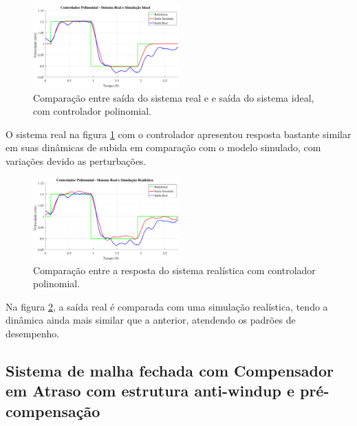 \documentclass[conference,harvard,brazil,english]{sbatex}
\begin{document}
            \begin{figure}[H]
                \centering
                \includegraphics[width=0.5\textwidth]{imagens/polinomial/comparacaoPolinomial.eps}
                \caption{Comparação entre saída do sistema real e e saída do sistema ideal, com controlador polinomial.}
                \label{fig:cont_poli_sc}
            \end{figure}
            
            O sistema real na figura \ref{fig:cont_poli_sc} com o controlador apresentou resposta bastante similar em suas dinâmicas de subida em comparação com o modelo simulado, com variações devido as perturbações.
            
            \begin{figure}[H]
                \centering
                \includegraphics[width=0.5\textwidth]{imagens/polinomial/comparacaoRealisticaPolinomial.eps}
                \caption{Comparação entre a resposta do sistema realística com controlador polinomial.}
                \label{fig:realistica_poli}
            \end{figure}
            
            Na figura \ref{fig:realistica_poli}, a saída real é comparada com uma simulação realística, tendo a dinâmica ainda mais similar que a anterior, atendendo os padrões de desempenho.
        
        \subsection{Sistema de malha fechada com Compensador em Atraso com estrutura anti-windup e pré-compensação}
        
\end{document}
